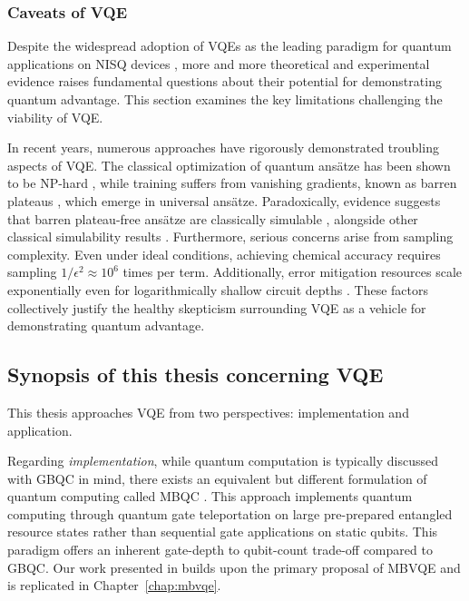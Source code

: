 \documentclass[../main.tex]{subfiles}
\begin{document}
\subsubsection{Caveats of VQE}

Despite the widespread adoption of \acp{VQE} as the leading paradigm for quantum applications on NISQ devices \cite{peruzzo2014variational, kandala2017hardware, google2020hartree}, more and more theoretical and experimental evidence raises fundamental questions about their potential for demonstrating quantum advantage. This section examines the key limitations challenging the viability of VQE. 

In recent years, numerous approaches have rigorously demonstrated troubling aspects of VQE. The classical optimization of quantum ansätze has been shown to be NP-hard \cite{bittel2021training}, while training suffers from vanishing gradients, known as barren plateaus \cite{mcclean2018barren}, which emerge in universal ansätze. Paradoxically, evidence suggests that barren plateau-free ansätze are classically simulable \cite{cerezo2023does}, alongside other classical simulability results  \cite{bermejo2024quantum, angrisani2024classically}. Furthermore, serious concerns arise from sampling complexity. Even under ideal conditions, achieving chemical accuracy requires sampling $1/\epsilon^2 \approx 10^6$ times per term. Additionally, error mitigation resources scale exponentially even for logarithmically shallow circuit depths \cite{quek2022exponentially}. These factors collectively justify the healthy skepticism surrounding VQE as a vehicle for demonstrating quantum advantage.

\subsection{Synopsis of this thesis concerning VQE}

This thesis approaches \ac{VQE} from two perspectives: implementation and application. 

Regarding \textit{implementation}, while quantum computation is typically discussed with \ac{GBQC} in mind, there exists an equivalent but different formulation of quantum computing called \ac{MBQC} \cite{raussendorf2003measurement}. This approach implements quantum computing through quantum gate teleportation on large pre-prepared entangled resource states rather than sequential gate applications on static qubits. This paradigm offers an inherent gate-depth to qubit-count trade-off compared to \ac{GBQC}. Our work presented in \cite{schroeder2024deterministic} builds upon the primary proposal of \ac{MBVQE} \cite{ferguson2021measurement} and is replicated in Chapter~\ref{chap:mbvqe}.
\end{document}
